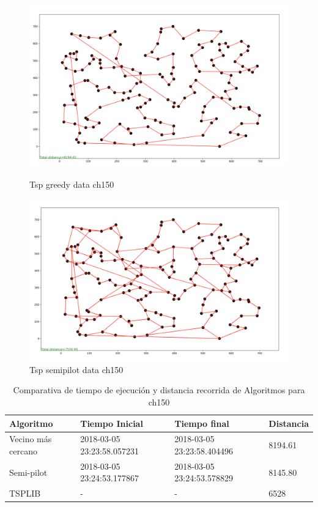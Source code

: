 \documentclass{article}
\begin{document}
\begin{figure}[H]
\begin{minipage}{0.5\textwidth}
	\centering
	\includegraphics[width=1\textwidth]{../../image/greedy/greedy-ch150.png}
	\caption{\label{fig:Figura1} Tsp greedy data ch150}
\end{minipage}\hfill
\begin {minipage}{0.5\textwidth}
\centering
\includegraphics[width=1\textwidth]{../../image/semipilot/semipilot-ch150-2-4.png}
\caption{\label{fig:Figura1} Tsp semipilot data ch150}
\end{minipage}
\end{figure}

\begin{table}[H]
\centering
\caption{Comparativa de tiempo de ejecución y distancia recorrida de Algoritmos para ch150}
\label{Table:ch150}
\begin{tabular}{| l | l | l | l |}
\hline
Algoritmo & Tiempo Inicial & Tiempo final & Distancia \\ \hline
Vecino más cercano & 2018-03-05 23:23:58.057231 & 2018-03-05 23:23:58.404496 & 8194.61 \\ \hline
Semi-pilot & 2018-03-05 23:24:53.177867 & 2018-03-05 23:24:53.578829 & 8145.80 \\ \hline
TSPLIB & - & - & 6528 \\ \hline

\end{tabular}
\end{table}
\end{document}
